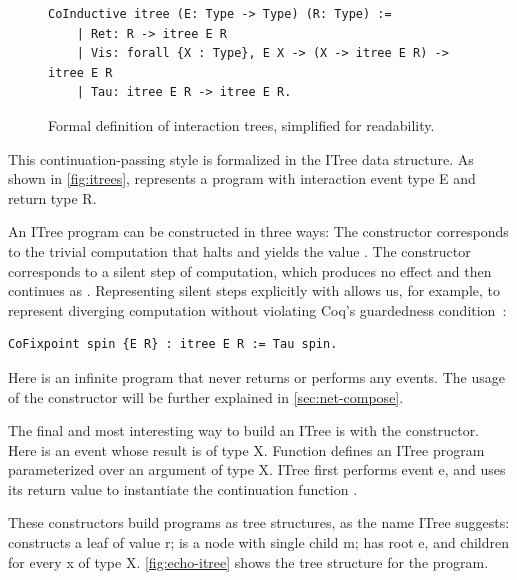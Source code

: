 \begin{figure}
  \begin{lstlisting}[style=customcoq]
    CoInductive itree (E: Type -> Type) (R: Type) :=
    | Ret: R -> itree E R
    | Vis: forall {X : Type}, E X -> (X -> itree E R) -> itree E R
    | Tau: itree E R -> itree E R.
  \end{lstlisting}
  \caption[Formal definition of interaction trees]{Formal definition of
    interaction trees, simplified for readability.}
  \label{fig:itrees}
\end{figure}

This continuation-passing style is formalized in the ITree data structure.  As
shown in \autoref{fig:itrees},  represents a program with
interaction event type \ilc E and return type \ilc R.

An ITree program can be constructed in three ways: The  constructor
corresponds to the trivial computation that halts and yields the value .
The  constructor corresponds to a silent step of computation, which
produces no effect and then continues as .  Representing silent steps
explicitly with  allows us, for example, to represent diverging
computation without violating Coq's guardedness condition~\cite{coinduction}:
\begin{lstlisting}[style=customcoq]
  CoFixpoint spin {E R} : itree E R := Tau spin.
\end{lstlisting}

Here  is an infinite program that never returns or performs any
events.  The usage of the  constructor will be further explained in
\autoref{sec:net-compose}.

The final and most interesting way to build an ITree is with the  constructor.  Here  is an event whose result is of type \ilc
X.  Function  defines an ITree program parameterized over an argument of
type \ilc X.  ITree  first performs event \ilc e, and uses its
return value  to instantiate the continuation function .

These constructors build programs as tree structures, as the name ITree
suggests:  constructs a leaf of value \ilc r;  is a
node with single child \ilc m;  has root \ilc e, and children
 for every \ilc x of type \ilc X.  \autoref{fig:echo-itree} shows the
tree structure for the  program.

